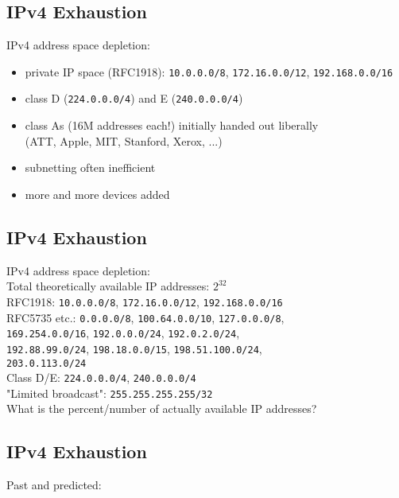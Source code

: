 \documentclass[xga]{xdvislides}
\begin{document}
\subsection{IPv4 Exhaustion}
IPv4 address space depletion: \\

\begin{itemize}
	\item private IP space (RFC1918): \verb+10.0.0.0/8+, \verb+172.16.0.0/12+, \verb+192.168.0.0/16+
	\item class D (\verb+224.0.0.0/4+) and E (\verb+240.0.0.0/4+)
	\item class As (16M addresses each!) initially handed out liberally \\
		(ATT, Apple, MIT, Stanford, Xerox, ...)
	\item subnetting often inefficient
	\item more and more devices added
\end{itemize}

\subsection{IPv4 Exhaustion}
IPv4 address space depletion: \\

Total theoretically available IP addresses: $2^{32}$
\\

RFC1918: {\tt 10.0.0.0/8}, {\tt 172.16.0.0/12}, {\tt 192.168.0.0/16}
\\

RFC5735 etc.: {\tt 0.0.0.0/8}, {\tt 100.64.0.0/10}, {\tt 127.0.0.0/8}, \\
{\tt 169.254.0.0/16}, {\tt 192.0.0.0/24}, {\tt 192.0.2.0/24}, \\
{\tt 192.88.99.0/24}, {\tt 198.18.0.0/15}, {\tt 198.51.100.0/24}, \\
{\tt 203.0.113.0/24}
\\

Class D/E: {\tt 224.0.0.0/4}, {\tt 240.0.0.0/4}
\\

"Limited broadcast": {\tt 255.255.255.255/32}
\\

What is the percent/number of actually available IP addresses?



\subsection{IPv4 Exhaustion}
Past and predicted: \\
\end{document}
